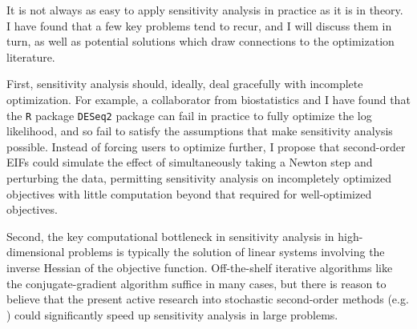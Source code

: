 It is not always as easy to apply sensitivity analysis in practice as it is in
theory.  I have found that a few key problems tend to recur, and I will discuss
them in turn, as well as potential solutions which draw connections to the
optimization literature.

First, sensitivity analysis should, ideally, deal gracefully with incomplete
optimization.  For example, a collaborator from biostatistics and I have found
that the \texttt{R} package \texttt{DESeq2} package \citep{deseq2} can fail in
practice to fully optimize the log likelihood, and so fail to satisfy the
assumptions that make sensitivity analysis possible.  Instead of forcing users
to optimize further, I propose that second-order EIFs could simulate the effect
of simultaneously taking a Newton step and perturbing the data, permitting
sensitivity analysis on incompletely optimized objectives with little
computation beyond that required for well-optimized objectives.
%
%

Second, the key computational bottleneck in sensitivity analysis in
high-dimensional problems is typically the solution of linear systems involving
the inverse Hessian of the objective function. Off-the-shelf iterative
algorithms like the conjugate-gradient algorithm \citep{nocedal:2006:numerical}
suffice in many cases, but there is reason to believe that the present active
research into stochastic second-order methods (e.g.
\citet{agarwal:2017:secondorder, berahas:2020:newtonsketch}) could significantly
speed up sensitivity analysis in large problems.


